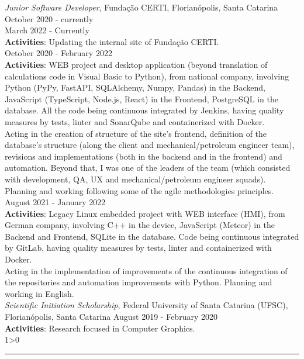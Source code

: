 \documentclass[a4paper,10pt]{article}
\newcommand{\createSection}[4][0]{
	\begin{tcolorbox}[
        blanker,
        breakable,
        title=\begin{minipage}{0.16\linewidth}\large{\textbf{#2}}\vspace{-#3\baselineskip}\end{minipage},
        coltitle=black,
        leftupper=0.21\linewidth,
    ]
        #4
		\ifnum0#1>0 { \hrule {\ } } \fi
    \end{tcolorbox}
}
\begin{document}
	\createSection[1]{Experience}{2}{
	    \textit{Junior Software Developer}, Fundação CERTI, Florianópolis, Santa Catarina \hfill October 2020 - currently \\
	    March 2022 - Currently\\
        \textbf{Activities}: Updating the internal site of Fundação CERTI.\\

        October 2020 - February 2022\\
        \textbf{Activities}: WEB project and desktop application (beyond translation of calculations code in Visual Basic to Python), from national company, involving Python (PyPy, FastAPI, SQLAlchemy, Numpy, Pandas) in the Backend, JavaScript (TypeScript, Node.js, React) in the Frontend, PostgreSQL in the database. All the code being continuous integrated by Jenkins, having quality measures by tests, linter and SonarQube and containerized with Docker.\\

        Acting in the creation of structure of the site's frontend, definition of the database's structure (along the client and mechanical/petroleum engineer team), revisions and implementations (both in the backend and in the frontend) and automation. Beyond that, I was one of the leaders of the team (which consisted with development, QA, UX and mechanical/petroleum engineer squads). Planning and working following some of the agile methodologies principles.\\

        August 2021 - January 2022\\
        \textbf{Activities}: Legacy Linux embedded project with WEB interface (HMI), from German company, involving C++ in the device, JavaScript (Meteor) in the Backend and Frontend, SQLite in the database. Code being continuous integrated by GitLab, having quality measures by tests, linter and containerized with Docker.\\

        Acting in the implementation of improvements of the continuous integration of the repositories and automation improvements with Python. Planning and working in English.\\

	    \textit{Scientific Initiation Scholarship}, Federal University of Santa Catarina (UFSC), Florianópolis, Santa Catarina \hfill August 2019 - February 2020 \\
		\textbf{Activities}: Research focused in Computer Graphics.\\

}
\end{document}
